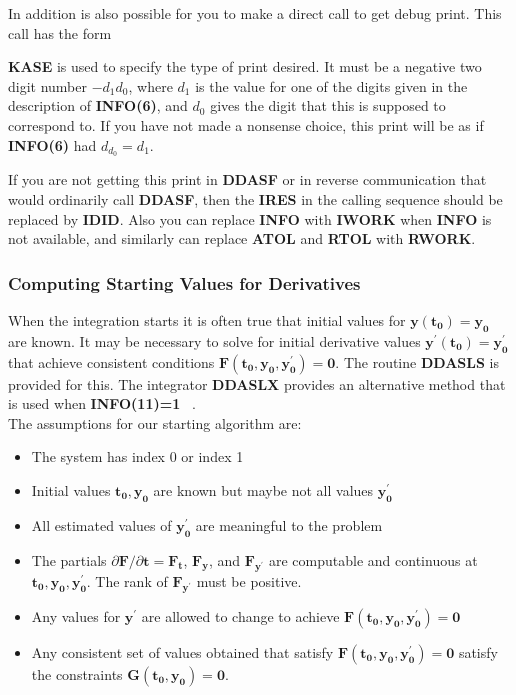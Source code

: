 \documentclass[twoside]{MATH77}
\begin{document}
In addition is also possible for you to make a direct call to get debug print.
This call has the form


\textbf{KASE} is used to specify the type of print desired.  It must be a
negative two digit number $-d_1d_0$, where $d_1$ is the value for one of the
digits given in the description of \textbf{INFO(6)}, and $d_0$ gives the digit
that this is supposed to correspond to.  If you have not made a nonsense
choice, this print will be as if \textbf{INFO(6)} had $d_{d_0} = d_1$.

If you are not getting this print in \textbf{DDASF} or in reverse
communication that would ordinarily call \textbf{DDASF}, then the
\textbf{IRES} in the calling sequence should be replaced by \textbf{IDID}.
Also you can replace \textbf{INFO} with \textbf{IWORK} when \textbf{INFO} is
not available, and similarly can replace \textbf{ATOL} and \textbf{RTOL} with
\textbf{RWORK}.

\subsubsection{Computing Starting Values for Derivatives\label{starting}}
When the integration starts it is often true that initial values for
$\mathbf{y(t_0)=y_0}$ are known.  It may be necessary to solve for
initial derivative values $\mathbf{y^{\prime}(t_0)=y^{\prime}_0}$ that
achieve consistent conditions $\mathbf{F(t_0,y_0,y^{\prime}_0)=0}$.
The routine \textbf{DDASLS} is provided for this.  The integrator
\textbf{DDASLX} provides an alternative method that
is used when \textbf{INFO(11)=1} ~\pageref{info11}.\\

The assumptions for our starting algorithm are:

\begin{itemize}
\item The system has index 0 or index 1
\item Initial values $\mathbf{t_0, y_0}$ are known but maybe not all
  values $\mathbf{y^{\prime}_0}$
\item All estimated values of $\mathbf{y^{\prime}_0}$ are meaningful
  to the problem
\item The partials $\partial \mathbf{F}/\partial \mathbf{t}= \mathbf{F_t}$,
$\mathbf{F_y}$, and  $\mathbf{F_{y^{\prime}}}$ are computable and
continuous at $\mathbf{t_0, y_0, y_0^{\prime}}$.  The rank 
of $\mathbf{F_{y^{\prime}}}$ must be positive.
\item Any values for $\mathbf{y^{\prime}}$ are allowed to change to
  achieve $\mathbf{F(t_0,y_0,y^{\prime}_0)=0}$
\item Any consistent set of values obtained that satisfy
  $\mathbf{F(t_0,y_0,y^{\prime}_0)=0}$ satisfy the constraints
  $\mathbf{G(t_0,y_0)=0}$.
\end{itemize}
\end{document}
